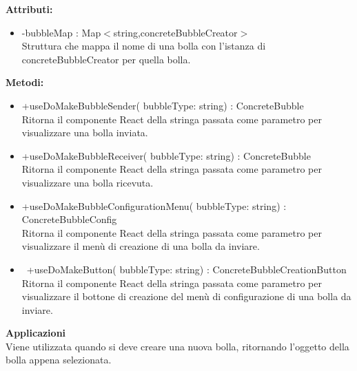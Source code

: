 \textbf{Attributi:}
\begin{itemize}
\item -bubbleMap : Map$<$string,concreteBubbleCreator$>$ 
\\
Struttura che mappa il nome di una bolla con l'istanza di concreteBubbleCreator per quella bolla.
\end{itemize}
\textbf{Metodi:} 
\begin{itemize}
\item +useDoMakeBubbleSender( bubbleType: string) : ConcreteBubble \\
Ritorna il componente React della stringa passata come parametro per visualizzare una bolla inviata.
\item +useDoMakeBubbleReceiver( bubbleType: string) : ConcreteBubble \\
Ritorna il componente React della stringa passata come parametro per visualizzare una bolla ricevuta.
\item +useDoMakeBubbleConfigurationMenu( bubbleType: string) : ConcreteBubbleConfig 
\\
Ritorna il componente React della stringa passata come parametro per visualizzare il menù di creazione di una bolla da inviare.
\item  +useDoMakeButton( bubbleType: string) : ConcreteBubbleCreationButton \\
Ritorna il componente React della stringa passata come parametro per visualizzare il bottone di creazione del menù di configurazione di una bolla da inviare.

\end{itemize} 


\textbf{Applicazioni}\\
Viene utilizzata quando si deve creare una nuova bolla, ritornando l'oggetto della bolla appena selezionata. 


